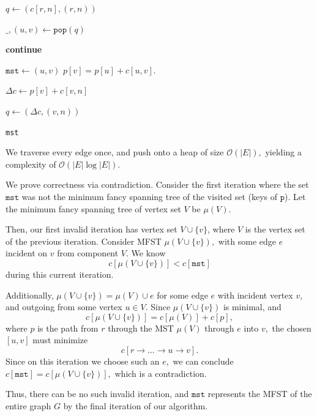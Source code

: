\documentclass[12pt]{article}
\begin{document}
\begin{enumerate}
\begin{algorithm}
\begin{algorithmic}
        \vspace{3mm}

        \State $q \gets (c[r, n], (r, n))$
        \EndFor

        \vspace{3mm}

        \State $\_, (u, v) \gets \texttt{pop}(q)$

        \vspace{3mm}

        \State \textbf{continue}
        \EndIf

        \vspace{3mm}

        \State $\texttt{mst} \gets (u, v)$
        \State $p[v] = p[u] + c[u, v].$

        \vspace{3mm}

        \State $\Delta c \gets p[v] + c[v, n]$

        \State $q \gets (\Delta c, (v, n))$
        \EndFor
        \EndWhile

        \vspace{3mm}

        \State \Return \texttt{mst}
        \EndProcedure
      \end{algorithmic}
    \end{algorithm}

    We traverse every edge once, and push onto a heap of size
    $\mathcal O(|E|),$ yielding a complexity of $\mathcal O(|E| \log |E|).$

    We prove correctness via contradiction. Consider the first
    iteration where the set $\texttt{mst}$ was not the minimum fancy
    spanning tree of the visited set (keys of $\texttt{p}$). Let the
    minimum fancy spanning tree of vertex set $V$ be $\mu(V).$

    Then, our first invalid iteration has vertex set $V \cup \{v\}$,
    where $V$ is the vertex set of the previous iteration. Consider
    MFST $\mu(V \cup \{v\}),$ with some edge $e$ incident on $v$ from
    component $V.$ We know $$
    c[\mu(V \cup \{v\})] < c[\texttt{mst}]
    $$
    during this current iteration.

    Additionally, $\mu(V \cup \{v\}) = \mu(V) \cup e$ for some edge
    $e$ with incident vertex $v,$ and outgoing from some vertex $u
    \in V$. Since $\mu(V \cup \{v\})$ is minimal, and $$c[\mu(V \cup
    \{v\})] = c[\mu(V)] + c[p],$$ where $p$ is the path from $r$
    through the MST $\mu(V)$ through $e$ into $v,$ the chosen $[u,
    v]$ must minimize
    $$
    c[r \to \ldots \to u \to v].
    $$
    Since on this iteration we choose such an $e,$ we can conclude
    $c[\texttt{mst}] = c[\mu(V \cup \{v\})],$ which is a contradiction.

    Thus, there can be no such invalid iteration, and $\texttt{mst}$
    represents the MFST of the entire graph $G$ by the final
    iteration of our algorithm.
\end{enumerate}
\end{document}
